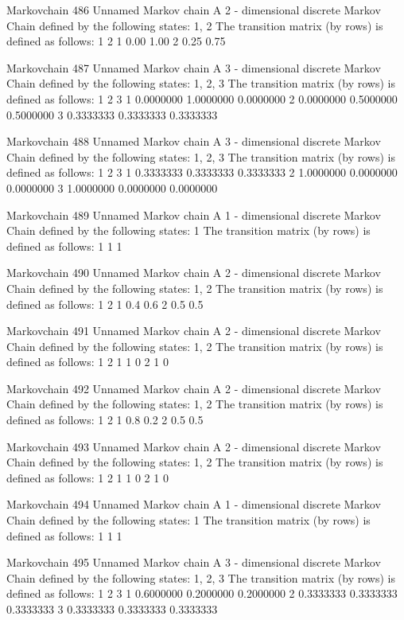 \documentclass[
  nojss]{jss}
\begin{document}
\begin{CodeChunk}
\begin{CodeOutput}
Markovchain  486 
Unnamed Markov chain 
 A  2 - dimensional discrete Markov Chain defined by the following states: 
 1, 2 
 The transition matrix  (by rows)  is defined as follows: 
     1    2
1 0.00 1.00
2 0.25 0.75

Markovchain  487 
Unnamed Markov chain 
 A  3 - dimensional discrete Markov Chain defined by the following states: 
 1, 2, 3 
 The transition matrix  (by rows)  is defined as follows: 
          1         2         3
1 0.0000000 1.0000000 0.0000000
2 0.0000000 0.5000000 0.5000000
3 0.3333333 0.3333333 0.3333333

Markovchain  488 
Unnamed Markov chain 
 A  3 - dimensional discrete Markov Chain defined by the following states: 
 1, 2, 3 
 The transition matrix  (by rows)  is defined as follows: 
          1         2         3
1 0.3333333 0.3333333 0.3333333
2 1.0000000 0.0000000 0.0000000
3 1.0000000 0.0000000 0.0000000

Markovchain  489 
Unnamed Markov chain 
 A  1 - dimensional discrete Markov Chain defined by the following states: 
 1 
 The transition matrix  (by rows)  is defined as follows: 
  1
1 1

Markovchain  490 
Unnamed Markov chain 
 A  2 - dimensional discrete Markov Chain defined by the following states: 
 1, 2 
 The transition matrix  (by rows)  is defined as follows: 
    1   2
1 0.4 0.6
2 0.5 0.5

Markovchain  491 
Unnamed Markov chain 
 A  2 - dimensional discrete Markov Chain defined by the following states: 
 1, 2 
 The transition matrix  (by rows)  is defined as follows: 
  1 2
1 1 0
2 1 0

Markovchain  492 
Unnamed Markov chain 
 A  2 - dimensional discrete Markov Chain defined by the following states: 
 1, 2 
 The transition matrix  (by rows)  is defined as follows: 
    1   2
1 0.8 0.2
2 0.5 0.5

Markovchain  493 
Unnamed Markov chain 
 A  2 - dimensional discrete Markov Chain defined by the following states: 
 1, 2 
 The transition matrix  (by rows)  is defined as follows: 
  1 2
1 1 0
2 1 0

Markovchain  494 
Unnamed Markov chain 
 A  1 - dimensional discrete Markov Chain defined by the following states: 
 1 
 The transition matrix  (by rows)  is defined as follows: 
  1
1 1

Markovchain  495 
Unnamed Markov chain 
 A  3 - dimensional discrete Markov Chain defined by the following states: 
 1, 2, 3 
 The transition matrix  (by rows)  is defined as follows: 
          1         2         3
1 0.6000000 0.2000000 0.2000000
2 0.3333333 0.3333333 0.3333333
3 0.3333333 0.3333333 0.3333333


\end{CodeOutput}
\end{CodeChunk}
\end{document}
